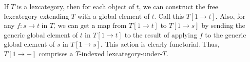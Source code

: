 \begin{definition}
If $T$ is a lexcategory, then for each object of $t$, we can construct the free lexcategory extending $T$ with a global element of $t$. Call this $T[1 \to t]$. Also, for any $f : s \to t$ in $T$, we can get a map from $T[1 \to t]$ to $T[1 \to s]$ by sending the generic global element of $t$ in $T[1 \to t]$ to the result of applying $f$ to the generic global element of $s$ in $T[1 \to s]$. This action is clearly functorial. Thus, $T[1 \to -]$ comprises a $T$-indexed lexcategory-under-$T$. 
\end{definition}

